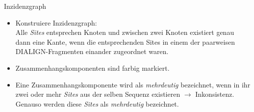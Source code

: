 \documentclass[wide,xcolor={x11names},hyperref={colorlinks=false},pantone312]{beamer}
\begin{document}
\begin{frame}[t, fragile]{Inzidenzgraph}
	\tiny
	\normalsize
	\begin{itemize}
		\item Konstruiere Inzidenzgraph:\\
		Alle \emph{Sites} entsprechen Knoten und zwischen zwei Knoten existiert genau dann eine Kante, wenn die entsprechenden Sites in einem der paarweisen DIALIGN-Fragmenten einander zugeordnet waren.
		\item Zusammenhangskomponenten sind farbig markiert.
		\item Eine Zusammenhangskomponente wird als \emph{mehrdeutig} bezeichnet, wenn in ihr zwei oder mehr \emph{Sites} aus der selben Sequenz existieren $\rightarrow$ Inkonsistenz. Genauso werden diese \emph{Sites} als \emph{mehrdeutig} bezeichnet. \cite{CPM10}
	\end{itemize}
\end{frame}
\end{document}
